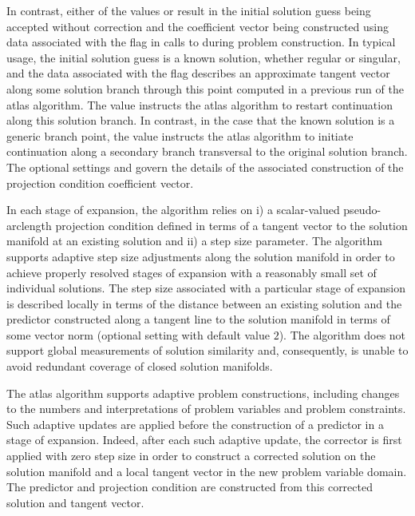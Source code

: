 In contrast, either of the values  or  result in the initial solution guess being accepted without correction and the coefficient vector being constructed using data associated with the  flag in calls to  during problem construction. In typical usage, the initial solution guess is a known solution, whether regular or singular, and the data associated with the  flag describes an approximate tangent vector along some solution branch through this point computed in a previous run of the atlas algorithm. The  value instructs the atlas algorithm to restart continuation along this solution branch. In contrast, in the case that the known solution is a generic branch point, the  value instructs the atlas algorithm to initiate continuation along a secondary branch transversal to the original solution branch. The optional settings  and  govern the details of the associated construction of the projection condition coefficient vector.

In each stage of expansion, the  algorithm relies on i) a scalar-valued pseudo-arclength projection condition defined in terms of a tangent vector to the solution manifold at an existing solution and ii) a step size parameter. The algorithm supports adaptive step size adjustments along the solution manifold in order to achieve properly resolved stages of expansion with a reasonably small set of individual solutions. The step size associated with a particular stage of expansion is described locally in terms of the distance between an existing solution and the predictor constructed along a tangent line to the solution manifold in terms of some vector norm (optional setting  with default value $2$). The algorithm does not support global measurements of solution similarity and, consequently, is unable to avoid redundant coverage of closed solution manifolds.

The  atlas algorithm supports adaptive problem constructions, including changes to the numbers and interpretations of problem variables and problem constraints. Such adaptive updates are applied before the construction of a predictor in a stage of expansion. Indeed, after each such adaptive update, the corrector is first applied with zero step size in order to construct a corrected solution on the solution manifold and a local tangent vector in the new problem variable domain. The predictor and projection condition are constructed from this corrected solution and tangent vector. 

